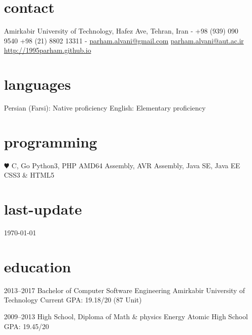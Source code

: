 \documentclass[]{friggeri-cv} %
\begin{document}


\begin{aside} %
\section{\textcolor{TextYellow}{c}ontact}
Amirkabir University of Technology,
Hafez Ave,
Tehran, Iran
-
+98 (939) 090 9540
+98 (21) 8802 13311
-
\href{mailto:parham.alvani@gmail.com}{parham.alvani@gmail.com}
\href{mailto:parham.alvani@aut.ac.ir}{parham.alvani@aut.ac.ir}
\href{http://1995parham.github.io/}{http://1995parham.github.io}
\section{\textcolor{TextOrange}{l}anguages}
Persian (Farsi):
Native proficiency
English:
Elementary proficiency
\section{\textcolor{TextGreen}{p}rogramming}
{\color{red} $\varheartsuit$} C, Go
Python3, PHP
AMD64 Assembly,
AVR Assembly,
Java SE, Java EE
CSS3 \& HTML5
\section{\textcolor{Ocean}{last}-update}
\today
\end{aside}


\section{education}

\begin{entrylist}


\entry
{2013--2017}
{Bachelor {\normalfont of Computer Software Engineering}}
{Amirkabir University of Technology}
{Current GPA: 19.18/20 (87 Unit)}


\entry
{2009--2013}
{High School, {\normalfont Diploma of Math \& physics}}
{Energy Atomic High School}
{GPA: 19.45/20}



\end{entrylist}
\end{document}
